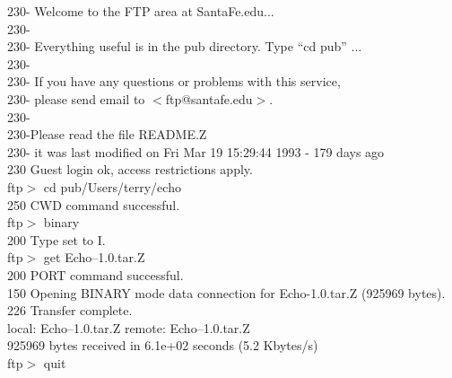 \begin{sl}
230-    Welcome to the FTP area at SantaFe.edu...                               \\
230-                                                                            \\
230-    Everything useful is in the pub directory.  Type ``cd pub'' ...         \\
230-                                                                            \\
230-    If you have any questions or problems with this service,                \\
230-    please send email to $<$ftp@santafe.edu$>$.                             \\
230-                                                                            \\
230-Please read the file README.Z                                               \\
230-  it was last modified on Fri Mar 19 15:29:44 1993 - 179 days ago           \\
230 Guest login ok, access restrictions apply.                                  \\
ftp$>$ {\sf cd pub/Users/terry/echo}                                            \\
250 CWD command successful.                                                     \\
ftp$>$ {\sf binary}                                                             \\
200 Type set to I.                                                              \\
ftp$>$ {\sf get Echo--1.0.tar.Z}                                                \\
200 PORT command successful.                                                    \\
150 Opening BINARY mode data connection for Echo-1.0.tar.Z (925969 bytes).      \\
226 Transfer complete.                                                          \\
local: Echo--1.0.tar.Z remote: Echo--1.0.tar.Z                                  \\
925969 bytes received in 6.1e+02 seconds (5.2 Kbytes/s)                         \\
ftp$>$ {\sf quit}                                                               \\
\end{sl}


